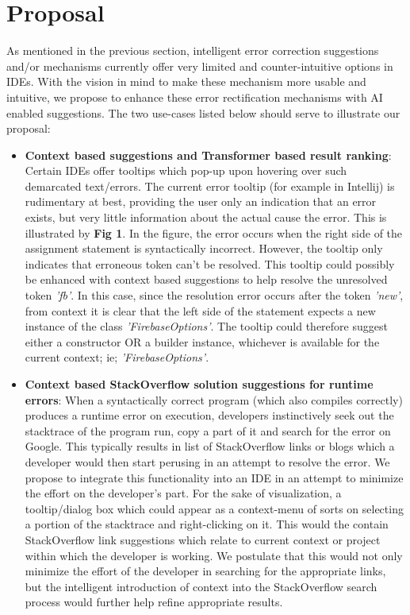 \documentclass[sigplan,screen,9pt]{acmart}
\begin{document}
\section{Proposal}
As mentioned in the previous section, intelligent error correction suggestions and/or mechanisms currently offer very limited and counter-intuitive options in IDEs. With the vision in mind to make these mechanism more usable and intuitive, we propose to enhance these error rectification mechanisms with AI enabled suggestions. The two use-cases listed below should serve to illustrate our proposal:
\begin{itemize}
    \item \textbf{Context based suggestions and Transformer based result ranking}: Certain IDEs offer tooltips which pop-up upon hovering over such demarcated text/errors. The current error tooltip (for example in Intellij) is rudimentary at best, providing the user only an indication that an error exists, but very little information about the actual cause the error. This is illustrated by \textbf{Fig 1}. In the figure, the error occurs when the right side of the assignment statement is syntactically incorrect. However, the tooltip only indicates that erroneous token can't be resolved.
    \newline
    This tooltip could possibly be enhanced with context based suggestions to help resolve the unresolved token \textit{'fb'}. In this case, since the resolution error occurs after the token \textit{'new'}, from context it is clear that the left side of the statement expects a new instance of the class \textit{'FirebaseOptions'}. The tooltip could therefore suggest either a constructor OR a builder instance, whichever is available for the current context; ie; \textit{'FirebaseOptions'}.
    \item \textbf{Context based StackOverflow solution suggestions for runtime errors}: When a syntactically correct program (which also compiles correctly) produces a runtime error on execution, developers instinctively seek out the stacktrace of the program run, copy a part of it and search for the error on Google. This typically results in list of StackOverflow links or blogs which a developer would then start perusing in an attempt to resolve the error.
    \newline
    We propose to integrate this functionality into an IDE in an attempt to minimize the effort on the developer's part. For the sake of visualization, a tooltip/dialog box which could appear as a context-menu of sorts on selecting a portion of the stacktrace and right-clicking on it. This would the contain StackOverflow link suggestions which relate to current context or project within which the developer is working. We postulate that this would not only minimize the effort of the developer in searching for the appropriate links, but the intelligent introduction of context into the StackOverflow search process would further help refine appropriate results.
\end{itemize}
\end{document}
